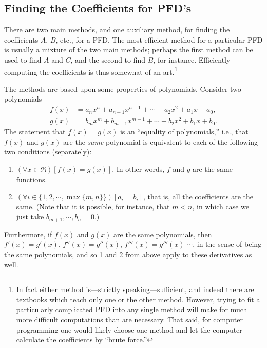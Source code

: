 \subsection{Finding the Coefficients for PFD's
\label{SubsecForFindingIntsWPFD's}}
There are two main methods, and one auxiliary method, for finding
the coefficients $A$, $B$, etc., for a PFD.  The most efficient
method for a particular PFD is usually a mixture of the two 
main methods; perhaps the first method can be used to find $A$
and $C$, and the second to find $B$, for instance.
Efficiently 
computing the coefficients is thus somewhat of an art.\footnote{%
In fact either method is---strictly 
speaking---sufficient, and indeed there are textbooks which
teach only one or the other method.  However, trying to fit a particularly
complicated PFD into any single method will make for much more difficult
computations than are necessary. That said, for computer programming one
would likely choose one method and let the computer calculate the coefficients
by ``brute force.''} 

The methods are based upon some properties of polynomials.  
Consider two polynomials 
\begin{align*}
 f(x)&=a_nx^n+a_{n-1}x^{n-1}+\cdots+a_2x^2+a_1x+a_0,\\
 g(x)&=b_mx^m+b_{m-1}x^{m-1}+\cdots+b_2x^2+b_1x+b_0.\end{align*}
The statement that  $f(x)=g(x)$ is an ``equality of polynomials,'' i.e., 
that $f(x)$ and $g(x)$ are the {\it same} polynomial is
equivalent to each of the following two conditions (separately):\footnotemark
\begin{enumerate}
\item $(\forall x\in\Re)[f(x)=g(x)]$.  In other words, $f$ and $g$
      are the same functions.
\item $(\forall i\in\{1,2,\cdots,\max\{m,n\}\})[a_i=b_i]$, that is, all the
      coefficients are the same.  (Note that it is possible, for 
      instance, that $m<n$, in which case we just take 
      $b_{m+1},\cdots,b_n=0$.)

\end{enumerate}
Furthermore, if $f(x)$ and $g(x)$ are the same polynomials, then
$f'(x)=g'(x)$, $f''(x)=g''(x)$, $f'''(x)=g'''(x)$ $\cdots$, in the 
sense of being the same polynomials, and so 1 and 2 from above
apply to these derivatives as well.

